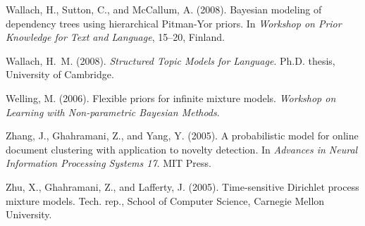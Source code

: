 \documentclass[twoside]{article}
\begin{document}
{\begin{thebibliography}{99}
Wallach, H., Sutton, C., and McCallum, A. (2008).
\newblock Bayesian modeling of dependency trees using hierarchical
  {P}itman-{Y}or priors.
\newblock In \emph{Workshop on Prior Knowledge for Text and
  Language},  15--20, Finland.

Wallach, H.~M. (2008).
\newblock \emph{Structured Topic Models for Language}.
\newblock Ph.D. thesis, University of Cambridge.

Welling, M. (2006).
\newblock Flexible priors for infinite mixture models.
\newblock \emph{Workshop on Learning with Non-parametric
  Bayesian Methods}.

Zhang, J., Ghahramani, Z., and Yang, Y. (2005).
\newblock A probabilistic model for online document clustering with application
  to novelty detection.
\newblock In \emph{Advances in Neural Information Processing Systems 17}. MIT
  Press.

Zhu, X., Ghahramani, Z., and Lafferty, J. (2005).
\newblock Time-sensitive {D}irichlet process mixture models.
\newblock Tech. rep., School of Computer Science, Carnegie Mellon University.

\end{thebibliography}

}
\end{document}
